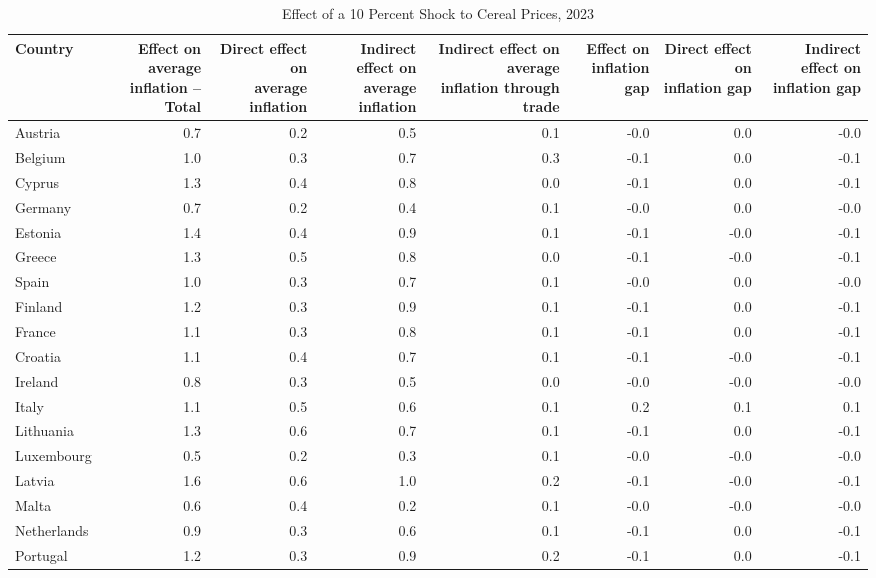 \documentclass[11pt]{article}
\begin{document}
\begin{table}[H]
\centering
\caption{Effect of a 10 Percent Shock to Cereal Prices, 2023}
\scriptsize
\setlength{\tabcolsep}{1.2pt}
\begin{tabular}{lrrrrrrr}
\toprule
Country & \shortstack{Effect on average\\inflation -- Total} & \shortstack{Direct effect on\\average inflation} & \shortstack{Indirect effect on\\average inflation} & \shortstack{Indirect effect on average\\inflation through trade} & \shortstack{Effect on\\inflation gap} & \shortstack{Direct effect on\\inflation gap} & \shortstack{Indirect effect on\\inflation gap}
 \\
\midrule
Austria & 0.7 & 0.2 & 0.5 & 0.1 & -0.0 & 0.0 & -0.0
 \\
Belgium & 1.0 & 0.3 & 0.7 & 0.3 & -0.1 & 0.0 & -0.1
 \\
Cyprus & 1.3 & 0.4 & 0.8 & 0.0 & -0.1 & 0.0 & -0.1
 \\
Germany & 0.7 & 0.2 & 0.4 & 0.1 & -0.0 & 0.0 & -0.0
 \\
Estonia & 1.4 & 0.4 & 0.9 & 0.1 & -0.1 & -0.0 & -0.1
 \\
Greece & 1.3 & 0.5 & 0.8 & 0.0 & -0.1 & -0.0 & -0.1
 \\
Spain & 1.0 & 0.3 & 0.7 & 0.1 & -0.0 & 0.0 & -0.0
 \\
Finland & 1.2 & 0.3 & 0.9 & 0.1 & -0.1 & 0.0 & -0.1
 \\
France & 1.1 & 0.3 & 0.8 & 0.1 & -0.1 & 0.0 & -0.1
 \\
Croatia & 1.1 & 0.4 & 0.7 & 0.1 & -0.1 & -0.0 & -0.1
 \\
Ireland & 0.8 & 0.3 & 0.5 & 0.0 & -0.0 & -0.0 & -0.0
 \\
Italy & 1.1 & 0.5 & 0.6 & 0.1 & 0.2 & 0.1 & 0.1
 \\
Lithuania & 1.3 & 0.6 & 0.7 & 0.1 & -0.1 & 0.0 & -0.1
 \\
Luxembourg & 0.5 & 0.2 & 0.3 & 0.1 & -0.0 & -0.0 & -0.0
 \\
Latvia & 1.6 & 0.6 & 1.0 & 0.2 & -0.1 & -0.0 & -0.1
 \\
Malta & 0.6 & 0.4 & 0.2 & 0.1 & -0.0 & -0.0 & -0.0
 \\
Netherlands & 0.9 & 0.3 & 0.6 & 0.1 & -0.1 & 0.0 & -0.1
 \\
Portugal & 1.2 & 0.3 & 0.9 & 0.2 & -0.1 & 0.0 & -0.1

\end{tabular}
\end{table}
\end{document}
